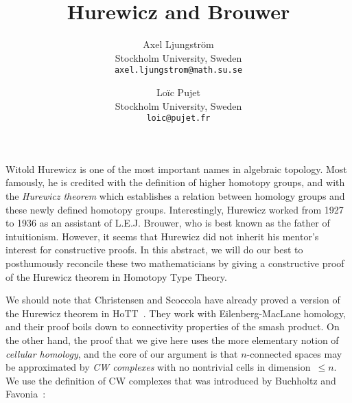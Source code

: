 \documentclass[a4page]{article}
\title{Hurewicz and Brouwer}
\author{
  Axel Ljungström\\
  \footnotesize{Stockholm University, Sweden}\\
  \footnotesize{\texttt{axel.ljungstrom@math.su.se}}
  \and
  Loïc Pujet\\
  \footnotesize{Stockholm University, Sweden}\\
  \footnotesize{\texttt{loic@pujet.fr}}
}
\date{}
\begin{document}
\maketitle
\vspace{-.5cm}
%
Witold Hurewicz is one of the most important names in algebraic topology.
Most famously, he is credited with the definition of higher homotopy groups, and with the
\emph{Hurewicz theorem} which establishes a relation between homology groups and these
newly defined homotopy groups.
%
Interestingly, Hurewicz worked from 1927 to 1936 as an assistant of L.E.J. Brouwer,
who is best known as the father of intuitionism.
%
However, it seems that Hurewicz did not inherit his mentor's interest for constructive proofs.
%
In this abstract, we will do our best to posthumously reconcile these two mathematicians
by giving a constructive proof of the Hurewicz theorem in Homotopy Type Theory.

We should note that Christensen and Scoccola have already proved a version of the Hurewicz
theorem in HoTT~\cite{christensen2020hurewicz}.
They work with Eilenberg-MacLane homology, and their proof boils down to connectivity
properties of the smash product.
%
On the other hand, the proof that we give here uses the more elementary notion of
\emph{cellular homology}, and the core of our argument is that \( n \)-connected spaces may be
approximated by \emph{CW complexes} with no nontrivial cells in dimension~\( \le n \).
%
We use the definition of CW complexes that was introduced by Buchholtz and Favonia~\cite{BuchholtzFavonia18}:
\end{document}
